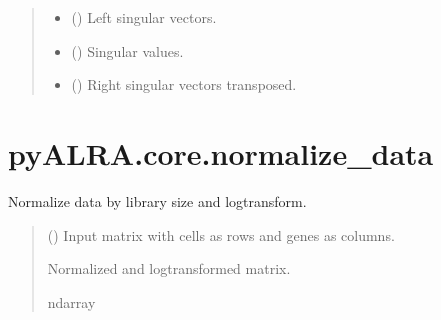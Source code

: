 \documentclass[letterpaper,10pt,english]{sphinxmanual}
\begin{document}
\begin{fulllineitems}
\begin{quote}
\begin{description}
\sphinxAtStartPar
\begin{itemize}
\item {} 
\sphinxAtStartPar
{} () \textendash{} Left singular vectors.

\item {} 
\sphinxAtStartPar
{} () \textendash{} Singular values.

\item {} 
\sphinxAtStartPar
{} () \textendash{} Right singular vectors transposed.

\end{itemize}


\end{description}\end{quote}

\end{fulllineitems}



\section{pyALRA.core.normalize\_data}
\label{\detokenize{core:pyalra-core-normalize-data}}

\begin{fulllineitems}
\label{\detokenize{core:pyALRA.core.normalize_data}}
\pysigstartsignatures
\pysiglinewithargsret
{}
{}
{}
\pysigstopsignatures
\sphinxAtStartPar
Normalize data by library size and log\sphinxhyphen{}transform.
\begin{quote}\begin{description}
\sphinxAtStartPar
{} () \textendash{} Input matrix with cells as rows and genes as columns.

\sphinxAtStartPar
Normalized and log\sphinxhyphen{}transformed matrix.

\sphinxAtStartPar
ndarray

\end{description}\end{quote}

\end{fulllineitems}




\renewcommand{\indexname}{Index}
\printindex
\end{document}
